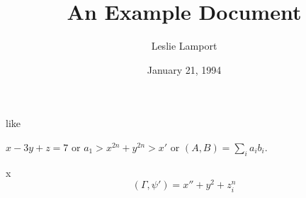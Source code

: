 \documentclass{article}      %
\title{An Example Document}  %
\author{Leslie Lamport}      %
\date{January 21, 1994}      %
\newcommand{\ip}[2]{(#1, #2)}
\begin{document}
\pagestyle{empty}             %
like

\( x - 3y + z = 7 \)
or
       \( a_{1} > x^{2n} + y^{2n} > x' \)
or  
       \( \ip{A}{B} = \sum_{i} a_{i} b_{i} \).

x
   \[  \ip{\Gamma}{\psi'} = x'' + y^{2} + z_{i}^{n}\]
\end{document}
